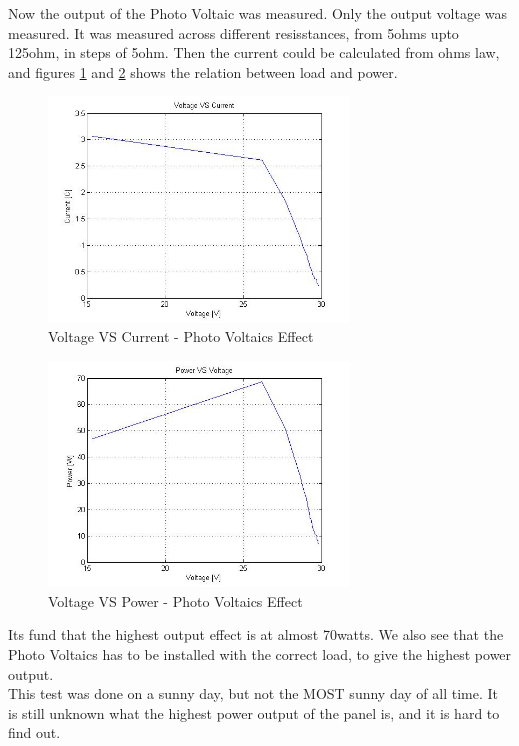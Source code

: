 Now the output of the Photo Voltaic was measured. Only the output voltage was measured. It was measured across different resisstances, from 5ohms upto 125ohm, in steps of 5ohm. Then the current could be calculated from ohms law, and figures \ref{fig:Voltage_VS_Current-PV_effect} and \ref{fig:Voltage_VS_Power-PV_effect} shows the relation between load and power. \\


\begin{figure}[H]
\centering
\includegraphics[width=8cm]{./img/Voltage_VS_Current-PV_effect}
\caption{Voltage VS Current - Photo Voltaics Effect}
\label{fig:Voltage_VS_Current-PV_effect}
\end{figure}

\begin{figure}[H]
\centering
\includegraphics[width=8cm]{./img/Voltage_VS_Power-PV_effect}
\caption{Voltage VS Power - Photo Voltaics Effect}
\label{fig:Voltage_VS_Power-PV_effect}
\end{figure}

Its fund that the highest output effect is at almost 70watts. We also see that the Photo Voltaics has to be installed with the correct load, to give the highest power output. \\
This test was done on a sunny day, but not the MOST sunny day of all time. It is still unknown what the highest power output of the panel is, and it is hard to find out. \\

